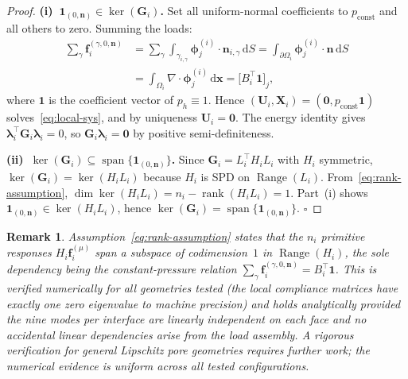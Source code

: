 \documentclass[11pt,a4paper]{article}
\newtheorem{remark}[lemma]{Remark}
\newcommand{\pore}[1]{\Omega_{#1}}
\newcommand{\iface}{\gamma}
\newcommand{\normal}{\bm{n}}
\newcommand{\trac}{\bm{\lambda}}
\newcommand{\DtN}{\mathbf{G}}
\newcommand{\one}{\mathbf{1}}
\newcommand{\loadvec}{\bm{f}}
\newcommand{\respvel}{\mathbf{U}}
\newcommand{\resppres}{\mathbf{X}}
\begin{document}
\begin{proof}
  \textbf{(i)~$\one_{(0,\normal)} \in \ker(\DtN_i)$.}
  Set all uniform-normal coefficients to $p_{\text{const}}$ and all others
  to zero.  Summing the loads:
  \begin{align*}
    \sum_{\gamma} \loadvec_i^{(\gamma,0,\normal)}
    &= \sum_{\gamma} \int_{\iface_{i,\gamma}}
       \bm{\phi}_j^{(i)} \cdot \normal_{i,\gamma} \,\mathrm{d}S
     = \int_{\partial\pore{i}} \bm{\phi}_j^{(i)} \cdot
       \normal \,\mathrm{d}S \\
    &= \int_{\pore{i}} \nabla\cdot\bm{\phi}_j^{(i)} \,\mathrm{d}\bm{x}
     = \bigl[B_i^\top \mathbf{1}\bigr]_j,
  \end{align*}
  where $\mathbf{1}$ is the coefficient vector of $p_h \equiv 1$.
  Hence $(\respvel_i,\resppres_i) = (\bm{0}, p_{\text{const}}\mathbf{1})$
  solves~\eqref{eq:local-sys}, and by uniqueness $\respvel_i = \bm{0}$.
  The energy identity gives $\trac_i^\top \DtN_i \trac_i = 0$, so
  $\DtN_i \trac_i = \bm{0}$ by positive semi-definiteness.

  \textbf{(ii)~$\ker(\DtN_i) \subseteq \operatorname{span}\{\one_{(0,\normal)}\}$.}
  Since $\DtN_i = L_i^\top H_i L_i$ with $H_i$ symmetric,
  $\ker(\DtN_i) = \ker(H_i L_i)$ because $H_i$ is SPD on
  $\operatorname{Range}(L_i)$.  From~\eqref{eq:rank-assumption},
  $\dim\ker(H_i L_i) = n_i - \operatorname{rank}(H_i L_i) = 1$.
  Part~(i) shows $\one_{(0,\normal)} \in \ker(H_i L_i)$, hence
  $\ker(\DtN_i) = \operatorname{span}\{\one_{(0,\normal)}\}$.
  \hfill$\square$
\end{proof}

\begin{remark}\label{rem:rank}
  Assumption~\eqref{eq:rank-assumption} states that the $n_i$ primitive
  responses $H_i \loadvec_i^{(\mu)}$ span a subspace of codimension~$1$ in
  $\operatorname{Range}(H_i)$, the sole dependency being the constant-pressure
  relation $\sum_\gamma \loadvec_i^{(\gamma,0,\normal)} = B_i^\top\mathbf{1}$.
  This is verified numerically for all geometries tested (the local compliance
  matrices have exactly one zero eigenvalue to machine precision) and holds
  analytically provided the nine modes per interface are linearly independent
  on each face and no accidental linear dependencies arise from the load
  assembly.  A rigorous verification for general Lipschitz pore geometries
  requires further work; the numerical evidence is uniform across all tested
  configurations.
\end{remark}
\end{document}
